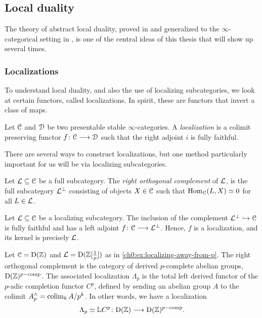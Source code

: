 \subsection{Local duality}
\label{ch0:ssec:local-duality}

The theory of abstract local duality, proved in \cite{hovey-palmiery-strickland_97} and generalized to the $\infty$-categorical setting in \cite{barthel-heard-valenzuela_2018}, is one of the central ideas of this thesis that will show up several times. 

\subsubsection{Localizations}

To understand local duality, and also the use of localizing subcategories, we look at certain functors, called localizations. In spirit, these are functors that invert a class of maps. 

\begin{definition}
    \label{ch0:def:localization}
    Let $\EuScript{C}$ and $\EuScript{D}$ be two presentable stable $\infty$-categories. A \emph{localization} is a colimit preserving functor $f\colon \EuScript{C}\longrightarrow \EuScript{D}$ such that the right adjoint $i$ is fully faithful.  
\end{definition}

There are several ways to construct localizations, but one method particularly important for us will be via localizing subcategories. 

\begin{definition}
    \label{ch0:def:right-orthogonal-complement}
    Let $\mathcal{L}\subseteq \EuScript{C}$ be a full subcategory. The \emph{right orthogonal complement} of $\mathcal{L}$, is the full subcategory $\mathcal{L}^\perp$ consisting of objects $X\in \EuScript{C}$ such that $\operatorname{Hom}_{\EuScript{C}}(L,X)\simeq 0$ for all $L\in \mathcal{L}$.  
\end{definition}

\begin{example}
    \label{ch0:ex:localization-from-localizing-subcategory}
    Let $\mathcal{L}\subseteq \EuScript{C}$ be a localizing subcategory. The inclusion of the complement $\mathcal{L}^\perp \hookrightarrow \EuScript{C}$ is fully faithful and has a left adjoint $f\colon \EuScript{C}\longrightarrow \mathcal{L}^\perp$. Hence, $f$ is a localization, and its kernel is precisely $\mathcal{L}$. 
\end{example}

\begin{example}
    \label{ch0:ex:derived-p-completion}
    Let $\EuScript{C}=\mathrm{D}(\mathbb{Z})$ and $\mathcal{L} = \mathrm{D}(\mathbb{Z}[\frac{1}{p}])$ as in \cref{ch0:ex:localizing-away-from-p}. The right orthogonal complement is the category of derived $p$-complete abelian groups, $\mathrm{D}(\mathbb{Z})^{p-\mathrm{comp}}$. The associated localization $\Lambda_p$ is the total left derived functor of the $p$-adic completion functor $C^p$, defined by sending an abelian group $A$ to the colimit $A^\wedge_p = \operatorname{colim}_k A/p^k$. In other words, we have a localization 
    \[\Lambda_p \simeq \mathbb{L} C^p \colon \mathrm{D}(\mathbb{Z})\longrightarrow \mathrm{D}(\mathbb{Z})^{p-\mathrm{comp}}.\]
\end{example}

